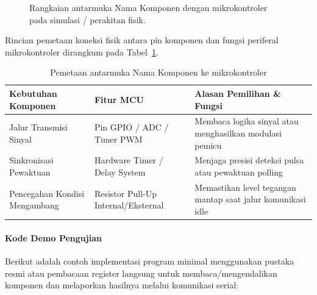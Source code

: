 \begin{figure}[htbp]
	\centering
	\caption{Rangkaian antarmuka Nama Komponen dengan mikrokontroler pada simulasi / perakitan fisik.}
	\label{fig:nama_komponen_schematic}
\end{figure}

Rincian pemetaan koneksi fisik antara pin komponen dan fungsi periferal mikrokontroler
dirangkum pada Tabel~\ref{tab:nama_komponen_mcu_mapping}.

\begin{table}[H]
	\centering
	\caption{Pemetaan antarmuka Nama Komponen ke mikrokontroler}
	\label{tab:nama_komponen_mcu_mapping}
	\small
	\begin{tabularx}{\textwidth}{@{}lXX@{}}
		\toprule
		Kebutuhan Komponen                & Fitur MCU                      & Alasan Pemilihan \& Fungsi                                   \\
		\midrule
		Jalur Transmisi Sinyal            & Pin GPIO / ADC / Timer PWM     & Membaca logika sinyal atau menghasilkan modulasi pemicu      \\
		Sinkronisasi Pewaktuan            & Hardware Timer / Delay System  & Menjaga presisi deteksi pulsa atau pewaktuan polling         \\
		Pencegahan Kondisi Mengambang     & Resistor Pull-Up Internal/Eksternal & Memastikan level tegangan mantap saat jalur komunikasi idle \\
		\bottomrule
	\end{tabularx}
\end{table}

\paragraph{Kode Demo Pengujian}
Berikut adalah contoh implementasi program minimal menggunakan pustaka resmi atau pembacaan
register langsung untuk membaca/mengendalikan komponen dan melaporkan hasilnya melalui komunikasi serial:

